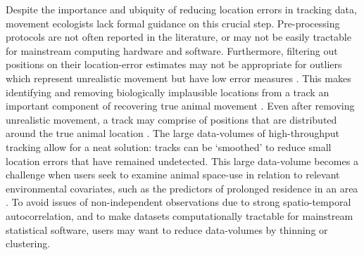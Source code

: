 \documentclass[10pt,paper=a4,headings=standardclasses
]{scrartcl}
\begin{document}
Despite the importance and ubiquity of reducing location errors in tracking data, movement ecologists lack formal guidance on this crucial step.
Pre-processing protocols are not often reported in the literature, or may not be easily tractable for mainstream computing hardware and software.
Furthermore, filtering out positions on their location-error estimates may not be appropriate for outliers which represent unrealistic movement but have low error measures \citep{weiser2016, ranacher2016}.
This makes identifying and removing biologically implausible locations from a track an important component of recovering true animal movement \citep{bjorneraas2010}.
Even after removing unrealistic movement, a track may comprise of positions that are distributed around the true animal location \citep{noonan2019}.
The large data-volumes of high-throughput tracking allow for a neat solution: tracks can be `smoothed' to reduce small location errors that have remained undetected.
This large data-volume becomes a challenge when users seek to examine animal space-use in relation to relevant environmental covariates, such as the predictors of prolonged residence in an area \citep[see][]{bracis2018, aarts2008, fleming2014a,bijleveld2016, oudman2018, harel2016}.
To avoid issues of non-independent observations due to strong spatio-temporal autocorrelation, and to make datasets computationally tractable for mainstream statistical software, users may want to reduce data-volumes by thinning or clustering.
\end{document}
